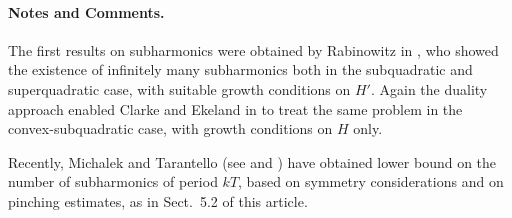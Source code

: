 \paragraph{Notes and Comments.}
The first results on subharmonics were
obtained by Rabinowitz in \cite{rab}, who showed the existence of
infinitely many subharmonics both in the subquadratic and superquadratic
case, with suitable growth conditions on $H'$. Again the duality
approach enabled Clarke and Ekeland in \cite{clar:eke:2} to treat the
same problem in the convex-subquadratic case, with growth conditions on
$H$ only.

Recently, Michalek and Tarantello (see \cite{mich:tar} and \cite{tar})
have obtained lower bound on the number of subharmonics of period $kT$,
based on symmetry considerations and on pinching estimates, as in
Sect.~5.2 of this article.


{}


%
%
%

